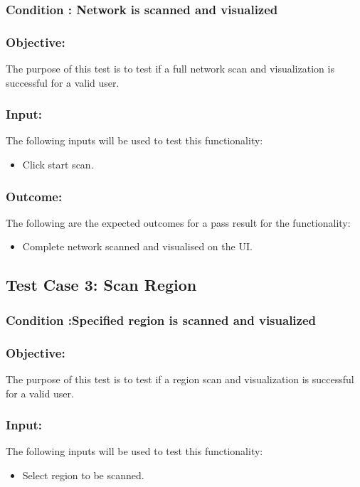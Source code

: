 \documentclass[hidelinks,a4paper,12pt]{article}
\begin{document}
\subsubsection{Condition : Network is scanned and visualized}
\subsubsection{Objective:} The purpose of this test is to test if a full network scan and visualization is successful for a valid user.

\subsubsection{Input:}
 The following inputs will be used to test this functionality:
\begin{itemize}
  \item Click start scan.
\end{itemize}
\subsubsection{Outcome: }
The following are the expected outcomes for a pass result for the functionality:
\begin{itemize}
\item Complete network scanned and visualised on the UI.

\end{itemize}

\subsection{Test Case 3: Scan Region }
\subsubsection{Condition :Specified region  is scanned and visualized}
\subsubsection{Objective:} The purpose of this test is to test if a region scan and visualization is successful for a valid user.

\subsubsection{Input:}
 The following inputs will be used to test this functionality:
\begin{itemize}
  \item Select region to be scanned.
\end{itemize}
\end{document}
